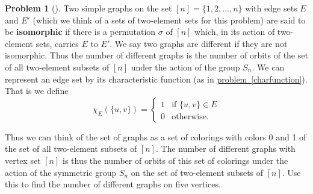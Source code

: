\documentclass[10pt,]{book}
\newcommand{\terminology}[1]{\textbf{#1}}
\theoremstyle{plain}
\theoremstyle{definition}
\newtheorem{activity}[project]{Problem}
\theoremstyle{definition}
\numberwithin{equation}{chapter}
\newcommand{\importantarrow}{\Rightarrow}
\newcommand{\amp}{&}
\begin{document}
\begin{activity}[]\marginsymbol[-1em]{\pdftooltip{$\importantarrow$}{especially interesting}} \label{activity-327}
Two simple graphs on the set \([n]= \{1,2,\ldots, n\}\) with edge sets \(E\) and \(E'\) (which we think of a sets of two-element sets for this problem) are said to be \terminology{isomorphic} if there is a permutation \(\sigma\) of \([n]\) which, in its action of two-element sets, carries \(E\) to \(E'\). We say two graphs are different if they are not isomorphic. Thus the number of different graphs is the number of orbits of the set of all two-element subsets of \([n]\) under the action of the group \(S_n\). We can represent an edge set by its characteristic function (as in \hyperref[charfunction]{problem~\ref{charfunction}}). That is we define%
\begin{equation*}
\chi_E(\{u,v\}) = \left\{
\begin{array}{ll}
1 \amp  \mbox{if \(\{u,v\}\in E\)} \\
0 \amp  \mbox{otherwise.}
\end{array} \right.
\end{equation*}
%
\par
Thus we can think of the set of graphs as a set of colorings with colors 0 and 1 of the set of all two-element subsets of \([n]\). The number of different graphs with vertex set \([n]\) is thus the number of orbits of this set of colorings under the action of the symmetric group \(S_n\) on the set of two-element subsets of \([n]\). Use this to find the number of different graphs on five vertices.%
\end{activity}
\typeout{************************************************}
\typeout{************************************************}
\end{document}
